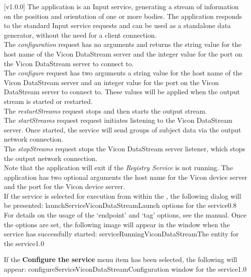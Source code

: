 [v1.0.0]
The  application is an Input service,
generating a stream of information on the position and orientation of one or more bodies.
The application responds to the standard Input service requests and can be used as a
standalone data generator, without the need for a client connection.\\

The \emph{configuration} request has no arguments and returns the string value for the
host name of the Vicon DataStream server and the integer value for the port on the Vicon
DataStream server to connect to.\\

The \emph{configure} request has two arguments \longDash{} a string value for the host
name of the Vicon DataStream server and an integer value for the port on the Vicon
DataStream server to connect to.
These values will be applied when the output stream is started or restarted.\\ 

The \emph{restartStreams} request stops and then starts the output stream.\\

The \emph{startStreams} request request initiates listening to the Vicon DataStream
server.
Once started, the service will send groups of subject data via the output \yarp{} network
connection.\\

The \emph{stopStreams} request stops the Vicon DataStream server listener, which stops the
output \yarp{} network connection.\\ 

Note that the application will exit if the \emph{Registry Service} is not running.
The application has two optional arguments \longDash{} the host name for the Vicon device
server and the port for the Vicon device server.
\insertAppParameters
\insertTagDescription{\VDSI}
\insertInputServiceComment\\

\insertStandardServiceCommands
\secondaryEnd
{}
If the service is selected for execution from within the \emph{\MMMU}, the following
dialog will be presented:
%
{launchServiceViconDataStream}{Launch options for the \VDSI{} service}{0.8}
\condPage{}
For details on the usage of the `endpoint' and `tag' options, see the \emph{\MMMU} manual.
Once the options are set, the following image will appear in the \emph{\MMMU} window when
the service has successfully started:
%
{serviceRunningViconDataStream}{The \emph{\MMMU} entity for the \VDSI{} service}{1.0}

If the \textbf{Configure the service} menu item has been selected, the following will
appear:
%
{configureServiceViconDataStream}{Configuration window for the \emph{\VDSI} service}{1.0}
\secondaryEnd
\primaryEnd{}
